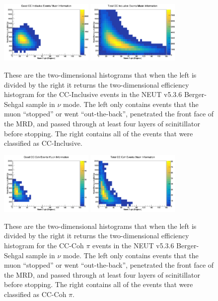 \documentclass[11pt]{article}
\begin{document}
\begin{figure}[H]
\centering
\includegraphics[width=0.4\textwidth]{NewNMBergerSehgalImages/6-GoodCCCohMuonInfoNMBS.png}
\includegraphics[width=0.4\textwidth]{NewNMBergerSehgalImages/9-TotalCCCohMuonInfoNMBS.png}
\caption{These are the two-dimensional histograms that when the left is divided by the right it returns the two-dimensional efficiency histogram for the CC-Inclusive events in the NEUT v5.3.6 Berger-Sehgal sample in $\nu$ mode. The left only contains events that the muon ``stopped'' or went ``out-the-back'', penetrated the front face of the MRD, and passed through at least four layers of scinitillator before stopping. The right contains all of the events that were classified as CC-Inclusive.}
\label{fig:app:NMCCInclusiveMuon2DBS}
\end{figure}

\begin{figure}[H]
\centering
\includegraphics[width=0.4\textwidth]{NewNMBergerSehgalImages/7.png}
\includegraphics[width=0.4\textwidth]{NewNMBergerSehgalImages/8.png}
\caption{These are the two-dimensional histograms that when the left is divided by the right it returns the two-dimensional efficiency histogram for the CC-Coh $\pi$ events in the NEUT v5.3.6 Berger-Sehgal sample in $\nu$ mode. The left only contains events that the muon ``stopped'' or went ``out-the-back'', penetrated the front face of the MRD, and passed through at least four layers of scinitillator before stopping. The right contains all of the events that were classified as CC-Coh $\pi$.}
\label{fig:app:NMCCCohMuon2DBS}
\end{figure}
\end{document}
